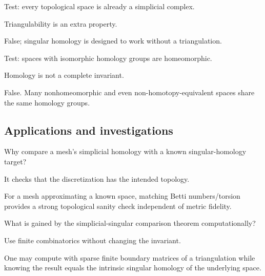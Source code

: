 \begin{exercise}\label{exr:viii17-ped-11}
Test: every topological space is already a simplicial complex.
\end{exercise}
\begin{hint}
Triangulability is an extra property.
\end{hint}
\begin{solution}
False; singular homology is designed to work without a triangulation.
\end{solution}

\begin{exercise}\label{exr:viii17-ped-12}
Test: spaces with isomorphic homology groups are homeomorphic.
\end{exercise}
\begin{hint}
Homology is not a complete invariant.
\end{hint}
\begin{solution}
False. Many nonhomeomorphic and even non-homotopy-equivalent spaces share the same homology groups.
\end{solution}

\subsection*{Applications and investigations}

\begin{exercise}\label{exr:viii17-ped-13}
Why compare a mesh's simplicial homology with a known singular-homology target?
\end{exercise}
\begin{hint}
It checks that the discretization has the intended topology.
\end{hint}
\begin{solution}
For a mesh approximating a known space, matching Betti numbers/torsion provides a strong topological sanity check independent of metric fidelity.
\end{solution}

\begin{exercise}\label{exr:viii17-ped-14}
What is gained by the simplicial-singular comparison theorem computationally?
\end{exercise}
\begin{hint}
Use finite combinatorics without changing the invariant.
\end{hint}
\begin{solution}
One may compute with sparse finite boundary matrices of a triangulation while knowing the result equals the intrinsic singular homology of the underlying space.
\end{solution}

